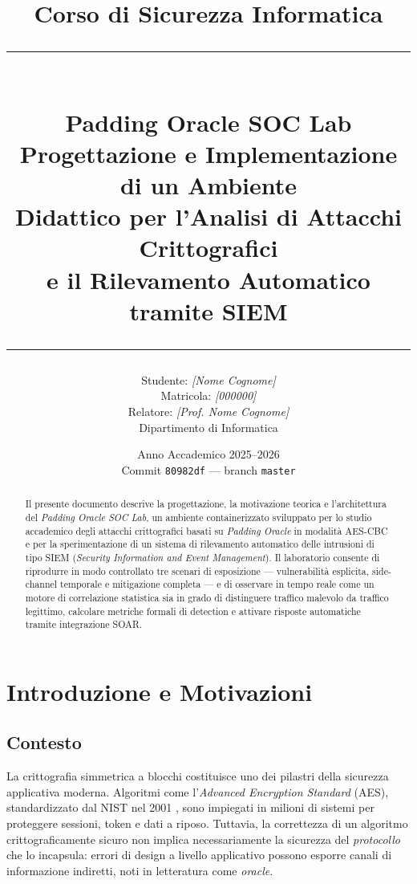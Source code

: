 \documentclass[12pt,a4paper]{article}
\title{
  \vspace{-1cm}
  {\Large Corso di Sicurezza Informatica}\\[0.4cm]
  {\rule{\linewidth}{0.5pt}}\\[0.4cm]
  {\LARGE\bfseries Padding Oracle SOC Lab}\\[0.2cm]
  {\large Progettazione e Implementazione di un Ambiente\\
   Didattico per l'Analisi di Attacchi Crittografici\\
   e il Rilevamento Automatico tramite SIEM}\\[0.4cm]
  {\rule{\linewidth}{0.5pt}}
}
\author{
  Studente: \textit{[Nome Cognome]}\\
  Matricola: \textit{[000000]}\\[0.2cm]
  Relatore: \textit{[Prof. Nome Cognome]}\\
  Dipartimento di Informatica
}
\date{Anno Accademico 2025--2026 \\ \vspace{0.2cm} \small Commit \texttt{80982df} — branch \texttt{master}}
\begin{document}
\maketitle
\thispagestyle{empty}
\clearpage

\begin{abstract}
\noindent
Il presente documento descrive la progettazione, la motivazione teorica e l'architettura del
\emph{Padding Oracle SOC Lab}, un ambiente containerizzato sviluppato per lo studio accademico
degli attacchi crittografici basati su \emph{Padding Oracle} in modalità \mbox{AES-CBC} e per
la sperimentazione di un sistema di rilevamento automatico delle intrusioni di tipo SIEM
(\emph{Security Information and Event Management}).
Il laboratorio consente di riprodurre in modo controllato tre scenari di esposizione — vulnerabilità
esplicita, side-channel temporale e mitigazione completa — e di osservare in tempo reale come un
motore di correlazione statistica sia in grado di distinguere traffico malevolo da traffico legittimo,
calcolare metriche formali di detection e attivare risposte automatiche tramite integrazione SOAR.
\end{abstract}

\tableofcontents
\clearpage

\section{Introduzione e Motivazioni}

\subsection{Contesto}

La crittografia simmetrica a blocchi costituisce uno dei pilastri della sicurezza applicativa moderna.
Algoritmi come l'\emph{Advanced Encryption Standard} (AES), standardizzato dal NIST nel 2001
\cite{nist-aes}, sono impiegati in milioni di sistemi per proteggere sessioni, token e dati a riposo.
Tuttavia, la correttezza di un algoritmo crittograficamente sicuro non implica necessariamente la
sicurezza del \emph{protocollo} che lo incapsula: errori di design a livello applicativo possono
esporre canali di informazione indiretti, noti in letteratura come \emph{oracle}.
\end{document}

